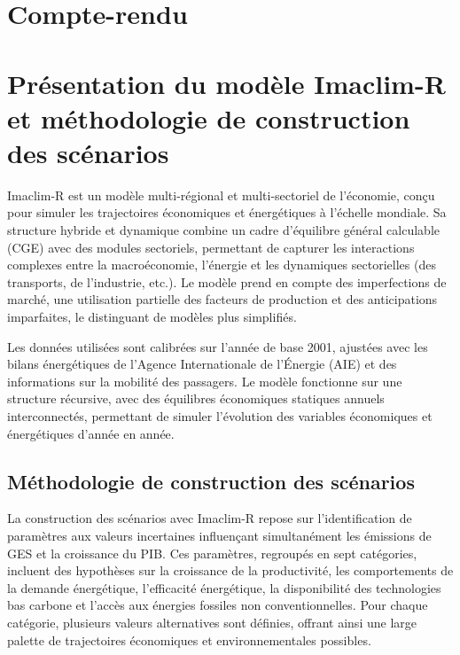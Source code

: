 \documentclass[a4,11pt]{aleph-notas}
\begin{document}
\newpage
\section*{\LARGE{Compte-rendu}}
\section{\Large{{Présentation du modèle Imaclim-R et méthodologie de construction des scénarios}}}
\vspace{0.3cm}

Imaclim-R est un modèle multi-régional et multi-sectoriel de l’économie, conçu pour simuler les trajectoires économiques et énergétiques à l’échelle mondiale. Sa structure hybride et dynamique combine un cadre d’équilibre général calculable (CGE) avec des modules sectoriels, permettant de capturer les interactions complexes entre la macroéconomie, l’énergie et les dynamiques sectorielles (des transports, de l'industrie, etc.). Le modèle prend en compte des imperfections de marché, une utilisation partielle des facteurs de production et des anticipations imparfaites, le distinguant de modèles plus simplifiés. 

Les données utilisées sont calibrées sur l’année de base 2001, ajustées avec les bilans énergétiques de l'Agence Internationale de l'Énergie (AIE) et des informations sur la mobilité des passagers. Le modèle fonctionne sur une structure récursive, avec des équilibres économiques statiques annuels interconnectés, permettant de simuler l’évolution des variables économiques et énergétiques d'année en année.

\subsection{Méthodologie de construction des scénarios}

La construction des scénarios avec Imaclim-R repose sur l’identification de paramètres aux valeurs incertaines influençant simultanément les émissions de GES et la croissance du PIB. Ces paramètres, regroupés en sept catégories, incluent des hypothèses sur la croissance de la productivité, les comportements de la demande énergétique, l’efficacité énergétique, la disponibilité des technologies bas carbone et l’accès aux énergies fossiles non conventionnelles. Pour chaque catégorie, plusieurs valeurs alternatives sont définies, offrant ainsi une large palette de trajectoires économiques et environnementales possibles.
\end{document}
